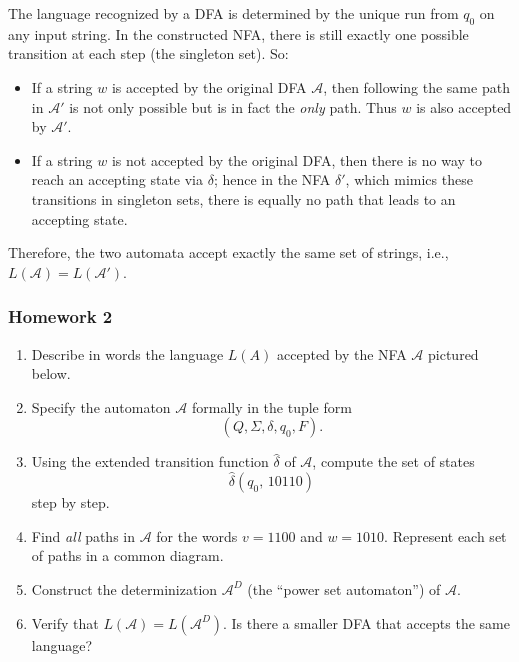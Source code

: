 \documentclass{article}
\begin{document}
The language recognized by a DFA is determined by the unique run from $q_0$ on any input string. In the constructed NFA, there is still exactly one possible transition at each step (the singleton set). So:
\begin{itemize}
\item If a string $w$ is accepted by the original DFA $\mathcal{A}$, then following the same path in $\mathcal{A}'$ is not only possible but is in fact the \emph{only} path. Thus $w$ is also accepted by $\mathcal{A}'$.
\item If a string $w$ is not accepted by the original DFA, then there is no way to reach an accepting state via $\delta$; hence in the NFA $\delta'$, which mimics these transitions in singleton sets, there is equally no path that leads to an accepting state.
\end{itemize}
Therefore, the two automata accept exactly the same set of strings, i.e., $L(\mathcal{A}) = L(\mathcal{A}')$.

\subsubsection{Homework 2}

\begin{enumerate}

\item Describe in words the language $L(A)$ accepted by the NFA $\mathcal{A}$ pictured below.

\item Specify the automaton $\mathcal{A}$ formally in the tuple form 
\[
(Q, \Sigma, \delta, q_0, F).
\]

\item Using the extended transition function $\hat{\delta}$ of $\mathcal{A}$, compute the set of states 
\[
\hat{\delta}(q_0,\,10110)
\]
step by step.

\item Find \emph{all} paths in $\mathcal{A}$ for the words $v = 1100$ and $w = 1010$. Represent each set of paths in a common diagram.

\item Construct the determinization $\mathcal{A}^D$ (the ``power set automaton'') of $\mathcal{A}$.

\item Verify that $L(\mathcal{A}) = L(\mathcal{A}^D)$.  Is there a smaller DFA that accepts the same language?

\end{enumerate}
\end{document}
